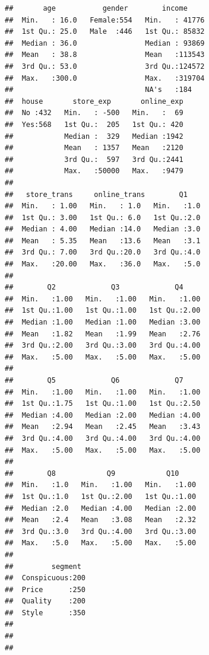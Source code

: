 \documentclass[12pt,]{krantz}
\theoremstyle{definition}
\theoremstyle{definition}
\theoremstyle{remark}
\begin{document}
\begin{verbatim}
##       age           gender        income      
##  Min.   : 16.0   Female:554   Min.   : 41776  
##  1st Qu.: 25.0   Male  :446   1st Qu.: 85832  
##  Median : 36.0                Median : 93869  
##  Mean   : 38.8                Mean   :113543  
##  3rd Qu.: 53.0                3rd Qu.:124572  
##  Max.   :300.0                Max.   :319704  
##                               NA's   :184     
##  house       store_exp       online_exp  
##  No :432   Min.   : -500   Min.   :  69  
##  Yes:568   1st Qu.:  205   1st Qu.: 420  
##            Median :  329   Median :1942  
##            Mean   : 1357   Mean   :2120  
##            3rd Qu.:  597   3rd Qu.:2441  
##            Max.   :50000   Max.   :9479  
##                                          
##   store_trans     online_trans        Q1     
##  Min.   : 1.00   Min.   : 1.0   Min.   :1.0  
##  1st Qu.: 3.00   1st Qu.: 6.0   1st Qu.:2.0  
##  Median : 4.00   Median :14.0   Median :3.0  
##  Mean   : 5.35   Mean   :13.6   Mean   :3.1  
##  3rd Qu.: 7.00   3rd Qu.:20.0   3rd Qu.:4.0  
##  Max.   :20.00   Max.   :36.0   Max.   :5.0  
##                                              
##        Q2             Q3             Q4      
##  Min.   :1.00   Min.   :1.00   Min.   :1.00  
##  1st Qu.:1.00   1st Qu.:1.00   1st Qu.:2.00  
##  Median :1.00   Median :1.00   Median :3.00  
##  Mean   :1.82   Mean   :1.99   Mean   :2.76  
##  3rd Qu.:2.00   3rd Qu.:3.00   3rd Qu.:4.00  
##  Max.   :5.00   Max.   :5.00   Max.   :5.00  
##                                              
##        Q5             Q6             Q7      
##  Min.   :1.00   Min.   :1.00   Min.   :1.00  
##  1st Qu.:1.75   1st Qu.:1.00   1st Qu.:2.50  
##  Median :4.00   Median :2.00   Median :4.00  
##  Mean   :2.94   Mean   :2.45   Mean   :3.43  
##  3rd Qu.:4.00   3rd Qu.:4.00   3rd Qu.:4.00  
##  Max.   :5.00   Max.   :5.00   Max.   :5.00  
##                                              
##        Q8            Q9            Q10      
##  Min.   :1.0   Min.   :1.00   Min.   :1.00  
##  1st Qu.:1.0   1st Qu.:2.00   1st Qu.:1.00  
##  Median :2.0   Median :4.00   Median :2.00  
##  Mean   :2.4   Mean   :3.08   Mean   :2.32  
##  3rd Qu.:3.0   3rd Qu.:4.00   3rd Qu.:3.00  
##  Max.   :5.0   Max.   :5.00   Max.   :5.00  
##                                             
##         segment   
##  Conspicuous:200  
##  Price      :250  
##  Quality    :200  
##  Style      :350  
##                   
##                   
## 
\end{verbatim}
\end{document}
